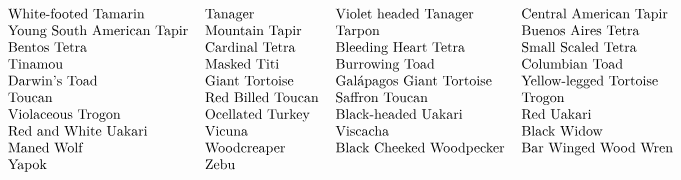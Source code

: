 \[\begin{tabular}{llll}
White-footed Tamarin  & Tanager   & Violet headed Tanager   & Central American Tapir \\
Young South American Tapir   & Mountain Tapir   & Tarpon  & Buenos Aires Tetra  \\
Bentos Tetra   & Cardinal Tetra  & Bleeding Heart Tetra   & Small Scaled Tetra  \\
Tinamou  & Masked Titi   & Burrowing Toad   & Columbian Toad \\
Darwin's Toad   & Giant Tortoise   & Gal\'{a}pagos Giant Tortoise  & Yellow-legged Tortoise  \\
Toucan   & Red Billed Toucan  & Saffron Toucan   & Trogon  \\
Violaceous Trogon  & Ocellated Turkey   & Black-headed Uakari   & Red Uakari \\
Red and White Uakari   & Vicuna   & Viscacha  & Black Widow  \\
Maned Wolf   & Woodcreaper  & Black Cheeked Woodpecker   & Bar Winged Wood Wren  \\
Yapok  & Zebu  &  & \\
\end{tabular}\]
